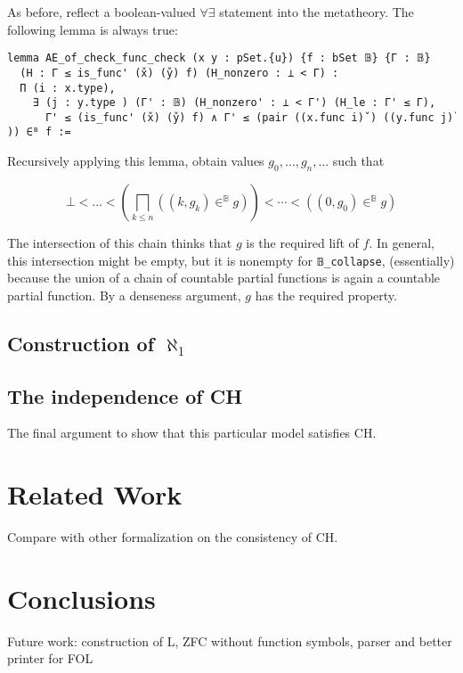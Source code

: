 \documentclass[sigplan,10pt,review, anonymous]{acmart}
\theoremstyle{definition}
\begin{document}
As before, reflect a boolean-valued \(\forall \exists\) statement into the metatheory. The following lemma is always true:
\begin{lstlisting}[breaklines, basicstyle=\ttfamily\footnotesize]
lemma AE_of_check_func_check (x y : pSet.{u}) {f : bSet 𝔹} {Γ : 𝔹}
  (H : Γ ≤ is_func' (x̌) (y̌) f) (H_nonzero : ⊥ < Γ) :
  Π (i : x.type),
    ∃ (j : y.type ) (Γ' : 𝔹) (H_nonzero' : ⊥ < Γ') (H_le : Γ' ≤ Γ),
      Γ' ≤ (is_func' (x̌) (y̌) f) ∧ Γ' ≤ (pair ((x.func i)̌ ) ((y.func j)̌ )) ∈ᴮ f :=
\end{lstlisting}

Recursively applying this lemma, obtain values \(g_0, \dots, g_n, \dots\) such that

\[\bot < \dots < \left(\bigsqcap_{k \leq n} ((k, g_k) \in^{\mathbb{B}} g)\right) < \cdots < ((0 , g_0) \in^{\mathbb{B}} g)\]

The intersection of this chain thinks that \(g\) is the required lift of \(f\). In general, this intersection might be empty, but it is nonempty for \lstinline{𝔹_collapse}, (essentially) because the union of a chain of countable partial functions is again a countable partial function. By a denseness argument, \(g\) has the required property.



\subsection{Construction of $\aleph_1$} \label{subsection:forcing:aleph-1}


\subsection{The independence of CH} \label{subsection:forcing:independence}

The final argument to show that this particular model satisfies CH.

\section{Related Work}
\label{section:related-work}
Compare with other formalization on the consistency of CH.


\section{Conclusions}
\label{section:conclusions}
Future work: construction of L, ZFC without function symbols, parser and better printer for FOL
\end{document}
